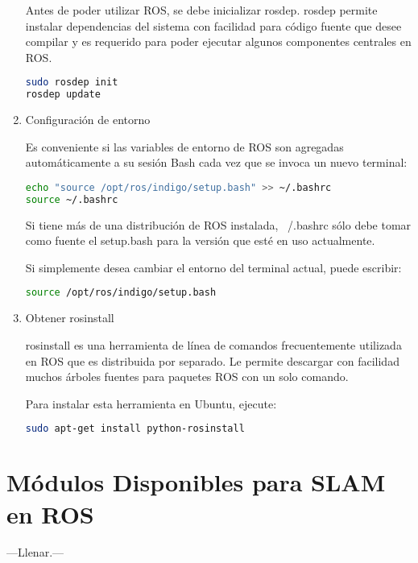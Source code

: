 \begin{enumerate}
	Antes de poder utilizar ROS, se debe inicializar rosdep. rosdep permite instalar dependencias del sistema con facilidad para código fuente que desee compilar y es requerido para poder ejecutar algunos componentes centrales en ROS.

	\begin{lstlisting}[language=bash]
sudo rosdep init
rosdep update
	\end{lstlisting}

	\item Configuración de entorno

	Es conveniente si las variables de entorno de ROS son agregadas automáticamente a su sesión Bash cada vez que se invoca un nuevo terminal:

	\begin{lstlisting}[language=bash]
echo "source /opt/ros/indigo/setup.bash" >> ~/.bashrc
source ~/.bashrc
	\end{lstlisting}

	Si tiene más de una distribución de ROS instalada, ~/.bashrc sólo debe tomar como fuente el setup.bash para la versión que esté en uso actualmente.

	Si simplemente desea cambiar el entorno del terminal actual, puede escribir:

	\begin{lstlisting}[language=bash]
source /opt/ros/indigo/setup.bash
	\end{lstlisting}

	\item Obtener rosinstall

rosinstall es una herramienta de línea de comandos frecuentemente utilizada en ROS que es distribuida por separado. Le permite descargar con facilidad muchos árboles fuentes para paquetes ROS con un solo comando.

Para instalar esta herramienta en Ubuntu, ejecute:

	\begin{lstlisting}[language=bash]
sudo apt-get install python-rosinstall
	\end{lstlisting}
\end{enumerate}

\section{Módulos Disponibles para SLAM en ROS}

---Llenar.---